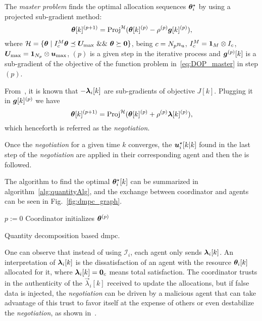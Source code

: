 \documentclass{ifacconf}  %
\begin{document}
The \emph{master problem} finds the optimal allocation sequences $\boldsymbol{\theta}_i^{\star}$ by using a projected sub-gradient method:
\begin{equation}
  \label{eq:projectedSubgradient}
\boldsymbol{\theta}[k]^{(p+1)}=\operatorname{Proj}^{\mathcal{H}}(\boldsymbol{\theta}[k]^{(p)}-\rho^{(p)}\boldsymbol{g}[k]^{(p)}),
\end{equation}
where ${\set{H} = \setbuild{\vec{\theta}}{I_{c}^{M}\vec{\theta}\preceq \vec{U}_{\max}\ \&\&\ \vec{\theta}\succeq\0 }}$, being ${c=N_{p} n_{u}}$, ${I_{c}^{M}=\mathbf{1}_{M}\mathbin{\otimes}I_{c}}$, ${\boldsymbol{U}_{\max}=\mathbf{1}_{N_{p}}\mathbin{\otimes}\boldsymbol{u}_{\max}}$, $(p)$ is a given step in the iterative process and $\boldsymbol{g}^{(p)}[k]$ is a sub-gradient of the objective of the function problem in~\eqref{eq:DOP_master} in step $(p)$.

From~\cite{BoydEtAl2015}, it is known that $-\lambdaik$ are sub-gradients of objective $J[k]$.
Plugging it in $\boldsymbol{g}[k]^{(p)}$ we have
\begin{equation}
  \label{eq:thetaNegot}
\boldsymbol{\theta}[k]^{(p+1)}=\operatorname{Proj}^{\mathcal{H}}(\boldsymbol{\theta}[k]^{(p)}+\rho^{(p)}\boldsymbol{\lambda}[k]^{(p)}),
\end{equation}
\newcommand{\negotiation}{\emph{negotiation}}
which henceforth is referred as the \negotiation.

Once the \negotiation{} for a given time $k$ converges, the $\optuikk$ found in the last step of the \negotiation{} are applied in their corresponding agent and then the \rhs{} is followed.

The algorithm to find the optimal $\boldsymbol{\theta}_i^{\star}[k]$ can be summarized in algorithm~\ref{alg:quantityAlg}, and the exchange between coordinator and agents can be seen in Fig.~\ref{fig:dmpc_graph}.

\begin{algorithm2e}[h]
  \DontPrintSemicolon%
  $p:=0$\;
  Coordinator initializes $\boldsymbol{\theta}^{(p)}$ \;
 \caption{Quantity decomposition based \acrlong{dmpc}.}\label{alg:quantityAlg}
\end{algorithm2e}

One can observe that instead of using $\mathcal{I}_{i}$, each agent only sends $\lambdaik$.
An interpretation of $\lambdaik$ is the dissatisfaction of an agent with the resource $\thetaik$ allocated for it, where ${\lambdaik=\0_{c}}$ means total satisfaction.
The coordinator trusts in the authenticity of the $\vec{\lambda}_{i}[k]$ received to update the allocations, but if false data is injected, the \negotiation{} can be driven by a malicious agent that can take advantage of this trust to favor itself at the expense of others or even destabilize the \negotiation{}, as shown in~\cite{NogueiraEtAl2021}.
\end{document}

